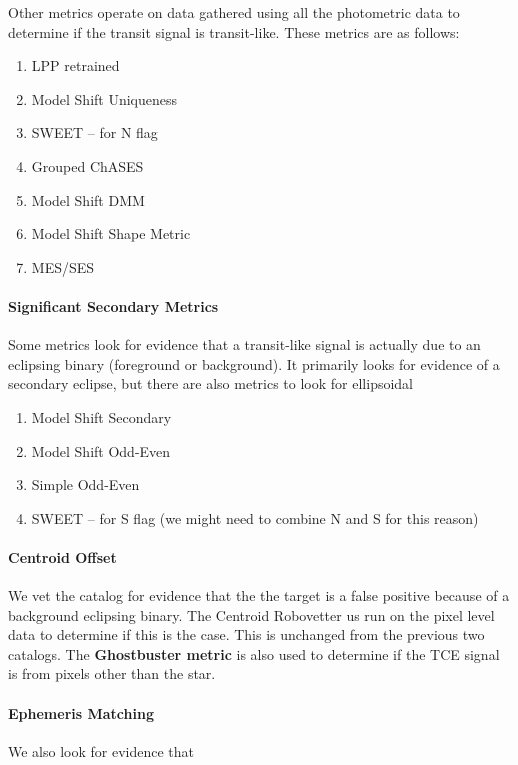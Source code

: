 \documentclass[onecolumn]{aastex6}
\begin{document}
Other metrics operate on data gathered using all the photometric data to determine if the transit signal is transit-like.  These metrics are as follows:

\begin{enumerate}
\item LPP retrained
\item Model Shift Uniqueness
\item SWEET -- for N flag
\item Grouped ChASES
\item Model Shift DMM
\item Model Shift Shape Metric
\item MES/SES

\end{enumerate}

\paragraph{Significant Secondary Metrics}
Some metrics look for evidence that a transit-like signal is actually due to an eclipsing binary (foreground or background).  It primarily looks for evidence of a secondary eclipse, but there are also metrics to look for ellipsoidal

\begin{enumerate}
\item Model Shift Secondary
\item Model Shift Odd-Even
\item Simple Odd-Even
\item SWEET -- for S flag (we might need to combine N and S for this reason)
\end{enumerate}


\paragraph{Centroid Offset} We vet the catalog for evidence that the the target is a false positive because of a background eclipsing binary. The Centroid Robovetter us run on the pixel level data to determine if this is the case.  This is unchanged from the previous two catalogs.  The \textbf{Ghostbuster metric} is also used to determine if the TCE signal is from pixels other than the star.

\paragraph{Ephemeris Matching} We also look for evidence that 
\end{document}
